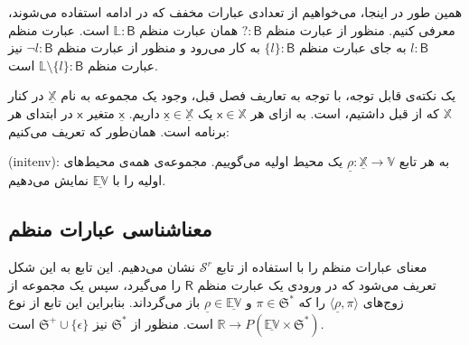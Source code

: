 همین‌ طور در اینجا، می‌خواهیم از تعدادی عبارات مخفف که در ادامه استفاده می‌شوند، معرفی کنیم. منظور از عبارت منظم 
$\mathsf{? : B}$
همان عبارت منظم
$\mathbb{L}\mathsf{ : B}$
است. عبارت منظم 
$l : \mathsf{B}$
به جای عبارت منظم 
$\{l\} : \mathsf{B}$
به کار می‌رود و منظور از عبارت منظم
$\neg l \mathsf{: B}$
نیز عبارت منظم 
$\mathbb{L}\setminus\{l\}:\mathsf{B}$
است. 

یک نکته‌ی قابل توجه، با توجه به تعاریف فصل قبل، وجود یک مجموعه به نام
$\mathbb{\underline{X}}$
در کنار 
$\mathbb{X}$
که از قبل داشتیم، است. به ازای هر 
$\mathsf{x}\in\mathbb{X}$
یک 
$\mathsf{\underline{x}}\in\mathbb{\underline{X}}$
داریم. 
$\mathsf{\underline{x}}$
متغیر 
$\mathsf{x}$
در ابتدای هر برنامه است.  همان‌طور که تعریف می‌کنیم:
\begin{defn}
	(\gls{initenv}): به هر تابع  
	$\underline{\rho}:\underline{\mathbb{X}}\rightarrow\mathbb{V}$
	یک محیط اولیه می‌گوییم. مجموعه‌ی همه‌ی محیط‌های اولیه را با 
	$\underline{\mathbb{EV}}$
	نمایش می‌دهیم.
\end{defn}
 
\subsection{معناشناسی عبارات منظم}
معنای عبارات منظم را با استفاده از تابع 
$\mathcal{S}^r$
نشان می‌دهیم. این تابع به این شکل تعریف می‌شود که در ورودی یک عبارت منظم 
$\mathsf{R}$
را می‌گیرد، سپس یک مجموعه از زوج‌های
$\langle\underline{\rho} , \pi\rangle$
را که 
$\pi \in \mathfrak{S^*}$
و 
$\underline{\rho} \in \underline{\mathbb{EV}}$
باز می‌گرداند. بنابراین این تابع از نوع
$\mathbb{R} \rightarrow \mathit{P} (\mathbb{\underline{EV}} \times \mathfrak{S}^*)$
است.
 منظور از 
 $\mathfrak{S}^*$
 نیز 
 $\mathfrak{S}^+ \cup \{\epsilon\}$
 است.
 
